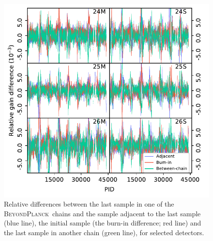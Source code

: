 \documentclass[twocolumn]{aa}
\newcommand{\BP}{\textsc{BeyondPlanck}}
\begin{document}
%
%
%
%
\begin{figure}
  \center
  \includegraphics[width=\linewidth]{figs/allpid_gains.pdf}
    \caption{Relative differences between the last sample in one of the \BP\ chains and the sample adjacent to the last sample (blue line), the initial sample (the burn-in difference; red line) and the last sample in another chain (green line), for selected detectors.}
  \label{fig:allpid_gains}
\end{figure}
\end{document}
